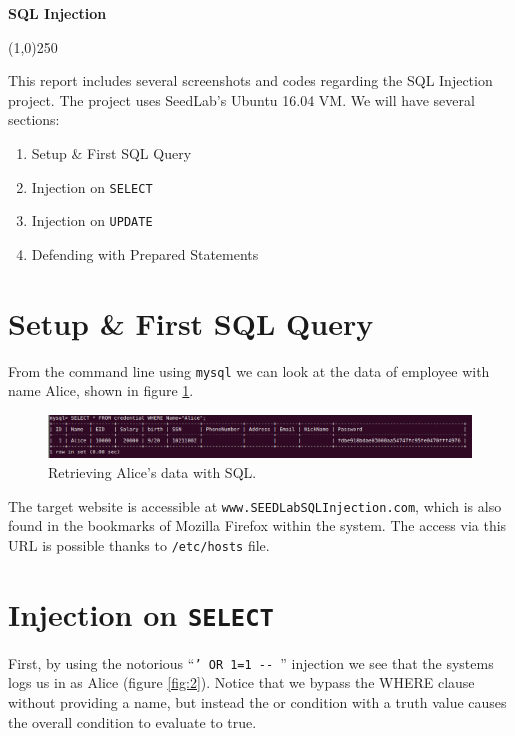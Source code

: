 \documentclass[12pt,reqno]{amsart}
\newcommand{\code}[1]{\texttt{#1}}
\begin{document}
\begin{center}
  \large\textbf{SQL Injection} \\
\end{center}

\begin{center}
  \line(1,0){250}
\end{center}

This report includes several screenshots and codes regarding the SQL Injection project. The project uses SeedLab's Ubuntu 16.04 VM. We will have several sections:
\begin{enumerate} 
  \item Setup \& First SQL Query
  \item Injection on \code{SELECT}
  \item Injection on \code{UPDATE}
  \item Defending with Prepared Statements
\end{enumerate}

\section{Setup \& First SQL Query}

From the command line using \code{mysql} we can look at the data of employee with name Alice, shown in figure \ref{fig:1}.
\begin{figure}[h]
  \includegraphics[width=\linewidth]{img/SQL_Alice_Query.png}
  \caption{Retrieving Alice's data with SQL.}
  \label{fig:1}
\end{figure}

The target website is accessible at \code{www.SEEDLabSQLInjection.com}, which is also found in the bookmarks of Mozilla Firefox within the system. The access via this URL is possible thanks to \code{/etc/hosts} file.

\section{Injection on \code{SELECT}}
First, by using the notorious ``\code{' OR 1=1 -{}- }'' injection we see that the systems logs us in as Alice (figure \ref{fig:2}). Notice that we bypass the WHERE clause without providing a name, but instead the or condition with a truth value causes the overall condition to evaluate to true.
\end{document}
